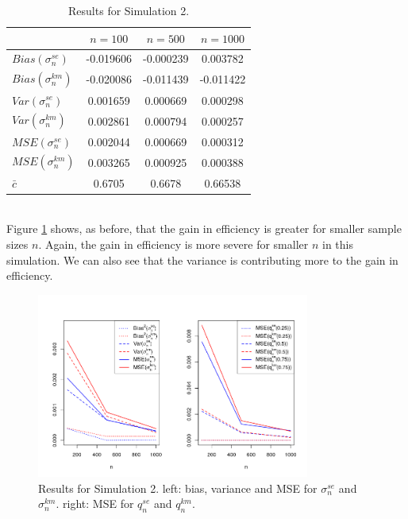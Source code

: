 \begin{table}[h!]
	\begin{center}
		\begin{tabular}{| l || c | c | c |}
			\hline
			&       $n=100$   &    $n=500$    &    $n=1000$\\
			\hline
			\hline
			$Bias(\sigma_n^{se})$ & -0.019606 & -0.000239 & 0.003782\\
			$Bias(\sigma_n^{km})$ & -0.020086 & -0.011439 & -0.011422\\
			\hline
			$Var(\sigma_n^{se})$ & 0.001659 & 0.000669 & 0.000298\\
			$Var(\sigma_n^{km})$ & 0.002861 & 0.000794 & 0.000257\\
			\hline
			$MSE(\sigma_n^{se})$ & 0.002044 & 0.000669 & 0.000312\\
			$MSE(\sigma_n^{km})$ & 0.003265 & 0.000925 & 0.000388\\
			\hline
			\hline
			$\bar c$ & 0.6705 & 0.6678 & 0.66538\\
			\hline
		\end{tabular}
	\end{center}
	\caption{Results for Simulation 2.}
	\label{tab:res_weiwei1}
\end{table}\\
%
Figure \ref{fig:mse_weiwei} shows, as before, that the gain in efficiency is greater for smaller sample sizes $n$. Again, the gain in efficiency is more severe for smaller $n$ in this simulation. We can also see that the variance is contributing more to the gain in efficiency.
%
\clearpage
%
\begin{figure}[h]
	\begin{center}
		\includegraphics[width=0.8\textwidth]{./figures/weiwei_mse2}
	\end{center}
	\caption{Results for Simulation 2. left: bias, variance and MSE for $\sigma_n^{se}$ and $\sigma_n^{km}$. right: MSE for $q_n^{se}$ and $q_n^{km}$.}
	\label{fig:mse_weiwei}
\end{figure}
